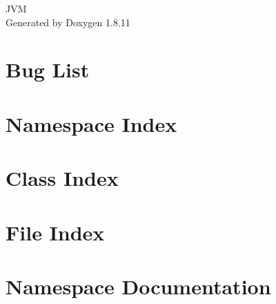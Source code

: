 \documentclass[twoside]{book}
\newcommand{\+}{\discretionary{\mbox{\scriptsize$\hookleftarrow$}}{}{}}
\newcommand{\clearemptydoublepage}{%
  \newpage{\pagestyle{empty}\cleardoublepage}%
}
\begin{document}
\hypersetup{pageanchor=false,
             bookmarksnumbered=true,
             pdfencoding=unicode
            }
\begin{titlepage}
\vspace*{7cm}
\begin{center}%
{\Large J\+VM }\\
\vspace*{1cm}
{\large Generated by Doxygen 1.8.11}\\
\end{center}
\end{titlepage}
\clearemptydoublepage
\tableofcontents
\clearemptydoublepage
{}
\hypersetup{pageanchor=true}

\chapter{Bug List}
\label{bug}
\hypertarget{bug}{}

\chapter{Namespace Index}

\chapter{Class Index}

\chapter{File Index}

\chapter{Namespace Documentation}

\end{document}
